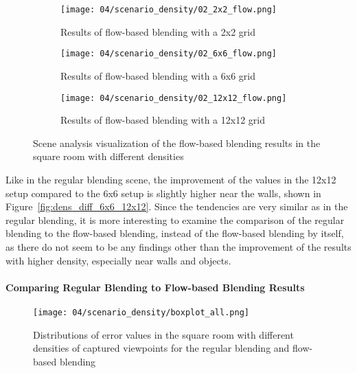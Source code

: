 \begin{figure}
\centering
    \hfill
    \begin{subfigure}[b]{0.32\textwidth}
            \centering
            \texttt{[image: 04/scenario\_density/02\_2x2\_flow.png]}
            \caption{Results of flow-based blending with a 2x2 grid}
    \end{subfigure}
    \hfill
    \begin{subfigure}[b]{0.32\textwidth}
            \centering
            \texttt{[image: 04/scenario\_density/02\_6x6\_flow.png]}
            \caption{Results of flow-based blending with a 6x6 grid}
    \end{subfigure}
    \hfill
    \begin{subfigure}[b]{0.32\textwidth}
            \centering
            \texttt{[image: 04/scenario\_density/02\_12x12\_flow.png]}
            \caption{Results of flow-based blending with a 12x12 grid}
    \end{subfigure}
    \hfill
  \caption{Scene analysis visualization of the flow-based blending results in the square room with different densities} \label{fig:density_flow_scene_analysis}
\end{figure}
Like in the regular blending scene, the improvement of the values in the 12x12 setup compared to the 6x6 setup is slightly higher near the walls, shown in Figure~\ref{fig:dens_diff_6x6_12x12}. Since the tendencies are very similar as in the regular blending, it is more interesting to examine the comparison of the regular blending to the flow-based blending, instead of the flow-based blending by itself, as there do not seem to be any findings other than the improvement of the results with higher density, especially near walls and objects.



\paragraph{Comparing Regular Blending to Flow-based Blending Results}
\begin{figure}
		\centering
		\texttt{[image: 04/scenario\_density/boxplot\_all.png]}
		\caption[Distributions of all of the results with different densities]{Distributions of error values in the square room with different densities of captured viewpoints for the regular blending and flow-based blending}
		\label{fig:scenario_dens_boxplot}
\end{figure}

